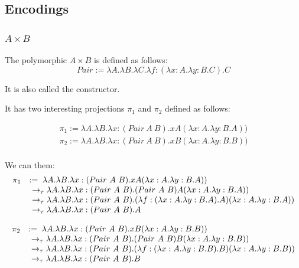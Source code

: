 \subsection{Encodings}

\subsubsection{$A \times B$}

The polymorphic $A \times B$ is defined as follows:
\[
    Pair := \lambda A.\lambda B.\lambda C.\lambda f:(\lambda x:A.\lambda y:B.C).C
\]

It is also called the constructor.

It has two interesting projections $\pi_1$ and $\pi_2$ defined as follows:

\[
\begin{array}{l}
    \pi_1 := \lambda A.\lambda B.\lambda x:(Pair\ A\ B).x A (\lambda x:A.\lambda y:B.A)) \\
    \pi_2 := \lambda A.\lambda B.\lambda x:(Pair\ A\ B).x B (\lambda x:A.\lambda y:B.B)) \\
\end{array}
\]

We can \taureduce them:
\[
\begin{array}{ll}
    \pi_1 & :=\;       \lambda A.\lambda B.\lambda x:(Pair\ A\ B).x A (\lambda x:A.\lambda y:B.A)) \\
        &\ \totau      \lambda A.\lambda B.\lambda x:(Pair\ A\ B).(Pair\ A\ B) A (\lambda x:A.\lambda y:B.A)) \\
        &\ \totau      \lambda A.\lambda B.\lambda x:(Pair\ A\ B).(\lambda f:(\lambda x:A.\lambda y:B.A).A) (\lambda x:A.\lambda y:B.A)) \\
        &\ \totau      \lambda A.\lambda B.\lambda x:(Pair\ A\ B).A \\
\end{array}
\]

\[
\begin{array}{ll}
    \pi_2 & :=\;       \lambda A.\lambda B.\lambda x:(Pair\ A\ B).x B (\lambda x:A.\lambda y:B.B)) \\
        &\ \totau      \lambda A.\lambda B.\lambda x:(Pair\ A\ B).(Pair\ A\ B) B (\lambda x:A.\lambda y:B.B)) \\
        &\ \totau      \lambda A.\lambda B.\lambda x:(Pair\ A\ B).(\lambda f:(\lambda x:A.\lambda y:B.B).B) (\lambda x:A.\lambda y:B.B)) \\
        &\ \totau      \lambda A.\lambda B.\lambda x:(Pair\ A\ B).B \\
\end{array}
\]

